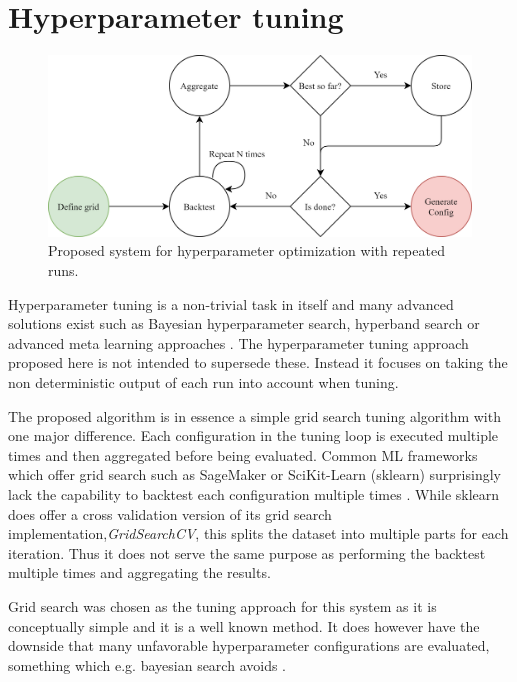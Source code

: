 \section{Hyperparameter tuning}
\label{sec:hpo}
\begin{figure}[h]
  \centering
  \includegraphics[width=\linewidth]{./img/tuning_overview.png}
  \caption{Proposed system for hyperparameter optimization with repeated runs.}
  \label{fig:proposed_hyperparameter_tuning}
\end{figure}
Hyperparameter tuning is a non-trivial task in itself and many advanced solutions exist such as Bayesian hyperparameter search, hyperband search or advanced meta learning approaches \cite{snoek2012practical,feurer2019hyperparameter, li2017hyperband}. The hyperparameter tuning approach proposed here is not intended to supersede these. Instead it focuses on taking the non deterministic output of each run into account when tuning.

The proposed algorithm is in essence a simple grid search tuning algorithm with one major difference. Each configuration in the tuning loop is executed multiple times and then aggregated before being evaluated. Common ML frameworks which offer grid search such as SageMaker or SciKit-Learn (sklearn) surprisingly lack the capability to backtest each configuration multiple times \cite{sagemaker_website, scikit-learn}. While sklearn does offer a cross validation version of its grid search implementation,\textit{GridSearchCV}, this splits the dataset into multiple parts for each iteration. Thus it does not serve the same purpose as performing the backtest multiple times and aggregating the results.

Grid search was chosen as the tuning approach for this system as it is conceptually simple and it is a well known method. It does however have the downside that many unfavorable hyperparameter configurations are evaluated, something which e.g. bayesian search avoids \cite{snoek2012practical}.

